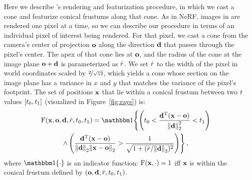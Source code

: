 \documentclass[10pt,twocolumn,letterpaper]{article}
\begin{document}
Here we describe \shortmodelnamelower's rendering and featurization procedure, in which we cast a cone and featurize conical frustums along that cone. As in NeRF, images in \shortmodelnamelower are rendered one pixel at a time, so we can describe our procedure in terms of an individual pixel of interest being rendered. For that pixel, we cast a cone from the camera's center of projection $\mathbf{o}$ along the direction $\mathbf{d}$ that passes through the pixel's center.
The apex of that cone lies at $\mathbf{o}$, and the radius of the cone at the image plane $\mathbf{o} + \mathbf{d}$ is parameterized as $\dot r$. We set $\dot r$ to the width of the pixel in world coordinates scaled by $\nicefrac{2}{\sqrt{12}}$, which yields a cone whose section on the image plane has a variance in $x$ and $y$ that matches the variance of the pixel's footprint.
The set of positions $\mathbf{x}$ that lie within a conical frustum between two $t$ values $[t_0, t_1]$ (visualized in Figure~\ref{fig:rays}) is:
\begin{gather}
\conefun(\position, \rayorigin,  \raydir, \baseradius, \zval_0, \zval_1) = 
\mathbbm 1 \Bigg\{ 
      \left(\zval_0 < \frac{\raydir^\transpose (\position - \rayorigin)}{\norm{\raydir}^2_2} < \zval_1 \right) \nonumber \\ 
      \land \, \left(\frac{\raydir^\transpose (\position - \rayorigin)}{\norm{\raydir}_2 \norm{\position - \rayorigin}_2} > \frac{1}{\sqrt{1 + (\baseradius / \norm{\raydir}_2)^2 }}\right) \Bigg\}\,,
\end{gather}
where $\mathbbm 1\{\cdot\}$ is an indicator function: $\operatorname{F}(\mathbf{x}, \cdot) = 1$ iff $\mathbf{x}$ is within the conical frustum defined by $(\mathbf{o},  \mathbf{d}, \dot r, t_0, t_1)$.
\end{document}
